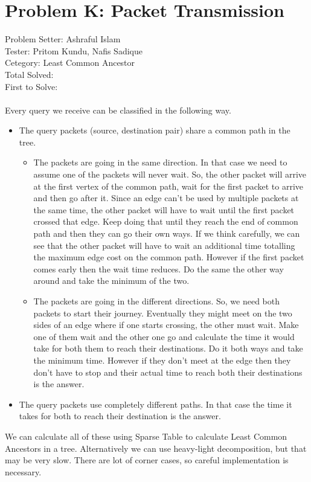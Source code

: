 \section*{Problem K: Packet Transmission}
Problem Setter: Ashraful Islam \\
Tester: Pritom Kundu, Nafis Sadique \\
Cetegory: Least Common Ancestor \\
Total Solved:  \\
First to Solve: \\
\\
Every query we receive can be classified in the following way.
\begin{itemize}
    \item The query packets (source, destination pair) share a common path in the tree. 
    \begin{itemize}
        \item The packets are going in the same direction. In that case we need to assume one of the
        packets will never wait. So, the other packet will arrive at the first vertex of the common path,
        wait for the first packet to arrive and then go after it. Since an edge can't be used by
        multiple packets at the same time, the other packet will have to wait until the first packet 
        crossed that edge. Keep doing that until they reach the end of common path and then they can 
        go their own ways. If we think carefully, we can see that the other packet will have to wait
        an additional time totalling the maximum edge cost on the common path. However if the first
        packet comes early then the wait time reduces. Do the same the other way around and take
        the minimum of the two.
        \item The packets are going in the different directions. So, we need both packets to start
        their journey. Eventually they might meet on the two sides of an edge where if one starts crossing,
        the other must wait. Make one of them wait and the other one go and calculate the time it would 
        take for both them to reach their destinations. Do it both ways and take the minimum time. However if
        they don't meet at the edge then they don't have to stop and their actual time to reach both 
        their destinations is the answer. 
    \end{itemize}
    \item The query packets use completely different paths. In that case the time it takes for both to reach
    their destination is the answer.
\end{itemize}
We can calculate all of these using Sparse Table to calculate Least Common Ancestors in a tree. Alternatively 
we can use heavy-light decomposition, but that may be very slow. There are lot of corner cases, so careful 
implementation is necessary.
